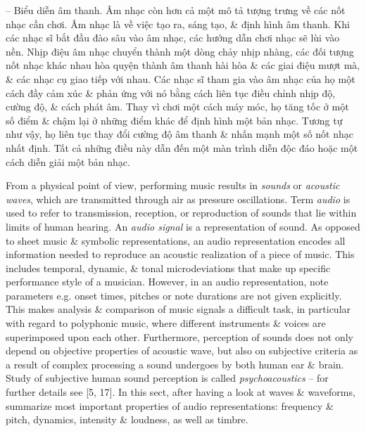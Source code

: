 \documentclass{article}
\begin{document}
\begin{itemize}
\begin{itemize}
		-- {\sf Biểu diễn âm thanh.} Âm nhạc còn hơn cả một mô tả tượng trưng về các nốt nhạc cần chơi. Âm nhạc là về việc tạo ra, sáng tạo, \& định hình âm thanh. Khi các nhạc sĩ bắt đầu đào sâu vào âm nhạc, các hướng dẫn chơi nhạc sẽ lùi vào nền. Nhịp điệu âm nhạc chuyển thành một dòng chảy nhịp nhàng, các đối tượng nốt nhạc khác nhau hòa quyện thành âm thanh hài hòa \& các giai điệu mượt mà, \& các nhạc cụ giao tiếp với nhau. Các nhạc sĩ tham gia vào âm nhạc của họ một cách đầy cảm xúc \& phản ứng với nó bằng cách liên tục điều chỉnh nhịp độ, cường độ, \& cách phát âm. Thay vì chơi một cách máy móc, họ tăng tốc ở một số điểm \& chậm lại ở những điểm khác để định hình một bản nhạc. Tương tự như vậy, họ liên tục thay đổi cường độ âm thanh \& nhấn mạnh một số nốt nhạc nhất định. Tất cả những điều này dẫn đến một màn trình diễn độc đáo hoặc một cách diễn giải một bản nhạc.
		
		From a physical point of view, performing music results in {\it sounds} or {\it acoustic waves}, which are transmitted through air as pressure oscillations. Term {\it audio} is used to refer to transmission, reception, or reproduction of sounds that lie within limits of human hearing. An {\it audio signal} is a representation of sound. As opposed to sheet music \& symbolic representations, an audio representation encodes all information needed to reproduce an acoustic realization of a piece of music. This includes temporal, dynamic, \& tonal microdeviations that make up specific performance style of a musician. However, in an audio representation, note parameters e.g. onset times, pitches or note durations are not given explicitly. This makes analysis \& comparison of music signals a difficult task, in particular with regard to polyphonic music, where different instruments \& voices are superimposed upon each other. Furthermore, perception of sounds does not only depend on objective properties of acoustic wave, but also on subjective criteria as a result of complex processing a sound undergoes by both human ear \& brain. Study of subjective human sound perception is called {\it psychoacoustics} -- for further details see [5, 17]. In this sect, after having a look at waves \& waveforms, summarize most important properties of audio representations: frequency \& pitch, dynamics, intensity \& loudness, as well as timbre.
		

\end{itemize}
\end{itemize}
\end{document}

